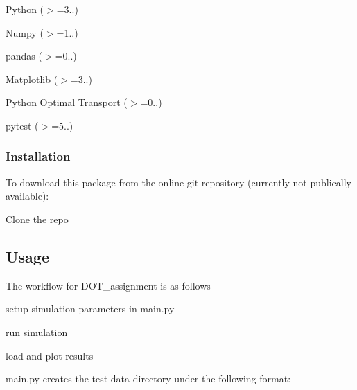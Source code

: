\begin{DoxyItemize}
\item Python ($>$=3..)
\item Numpy ($>$=1..)
\item pandas ($>$=0..)
\item Matplotlib ($>$=3..)
\item Python Optimal Transport ($>$=0..) 
\begin{DoxyCode}{0}
\end{DoxyCode}

\item pytest ($>$=5..) 
\begin{DoxyCode}{0}
\end{DoxyCode}

\end{DoxyItemize}

\subsubsection*{Installation}

To download this package from the online git repository (currently not publically available)\+:


\begin{DoxyEnumerate}
\item Clone the repo 
\begin{DoxyCode}{0}
\end{DoxyCode}

\end{DoxyEnumerate}

\subsection*{Usage}

The workflow for D\+O\+T\+\_\+assignment is as follows
\begin{DoxyEnumerate}
\item setup simulation parameters in main.\+py
\item run simulation
\item load and plot results
\end{DoxyEnumerate}

main.\+py creates the test data directory under the following format\+: 
\begin{DoxyCode}{0}
\end{DoxyCode}


